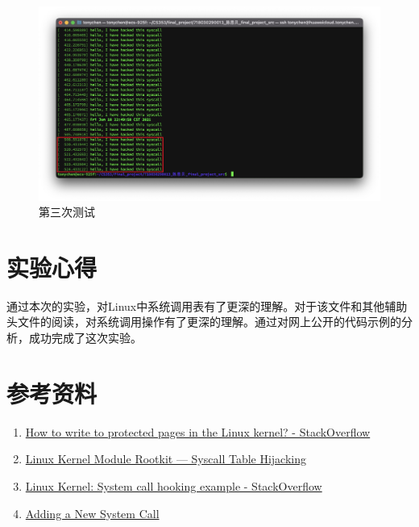 \documentclass[UTF8]{ctexrep}
\begin{document}
\begin{enumerate}
        \begin{figure}[h!]
            \centering
            \includegraphics[width=15cm,keepaspectratio]{images/demo3.png}
            \caption{第三次测试}
            \label{ref:demo3}
        \end{figure}
    \end{enumerate}

    \section{实验心得}

    通过本次的实验，对Linux中系统调用表有了更深的理解。对于该文件和其他辅助头文件的阅读，对系统调用操作有了更深的理解。通过对网上公开的代码示例的分析，成功完成了这次实验。\\
    
    \section{参考资料}
    
    \begin{enumerate}
        \item \href{https://stackoverflow.com/questions/58512430/how-to-write-to-protected-pages-in-the-linux-kernel/60564037#60564037}{How to write to protected pages in the Linux kernel? - StackOverflow}
        \item \href{https://infosecwriteups.com/linux-kernel-module-rootkit-syscall-table-hijacking-8f1bc0bd099c}{Linux Kernel Module Rootkit — Syscall Table Hijacking}
        \item \href{https://stackoverflow.com/questions/2103315/linux-kernel-system-call-hooking-example}{Linux Kernel: System call hooking example - StackOverflow}
        \item \href{https://www.kernel.org/doc/html/latest/process/adding-syscalls.html}{Adding a New System Call}
    \end{enumerate}
    \vspace{.3cm}
\end{document}
